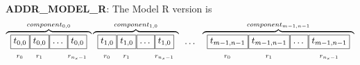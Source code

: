 \textbf{ADDR\_MODEL\_R}: The Model R version is
\[
\overbrace{
\begin{array}{cc} \boxed{t_{0,0}} \\  _{r_0} \end{array} \mkern-17mu
\begin{array}{cc} \boxed{t_{0,0}} \\  _{r_1} \end{array} \mkern-17mu
\begin{array}{cc} \boxed{\ldots\vphantom{t_{0,0}}} \\ \phantom{r_2}\end{array} \mkern-18mu
\begin{array}{cc} \boxed{t_{0,0}} \\  _{r_{n_s-1}} \end{array}
}^{component_{0,0}}
\overbrace{
\begin{array}{cc} \boxed{t_{1,0}} \\  _{r_0} \end{array} \mkern-17mu
\begin{array}{cc} \boxed{t_{1,0}} \\  _{r_1} \end{array} \mkern-17mu
\begin{array}{cc} \boxed{\ldots\vphantom{t_{0,0}}} \\ \phantom{r_2}\end{array} \mkern-18mu
\begin{array}{cc} \boxed{t_{1,0}} \\  _{r_{n_s-1}} \end{array}
}^{component_{1,0}}
\begin{array}{cc} \ldots\vphantom{t_{n-1}} \\ \phantom{r_2}\end{array}
\overbrace{
\begin{array}{cc} \boxed{t_{m-1,n-1}} \\  _{r_0} \end{array} \mkern-17mu
\begin{array}{cc} \boxed{t_{m-1,n-1}} \\  _{r_1} \end{array} \mkern-17mu
\begin{array}{cc} \boxed{\ldots\vphantom{t_{0,0}}} \\ \phantom{r_2}\end{array} \mkern-17mu
\begin{array}{cc} \boxed{t_{m-1,n-1}} \\  _{r_{n_s-1}} \end{array}
}^{component_{m-1,n-1}}
\]


